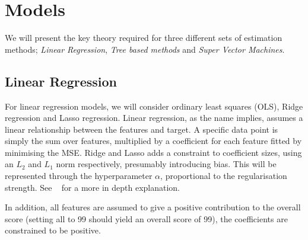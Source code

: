     \section{Models}
        We will present the key theory required for three different sets of estimation methods; \textit{Linear Regression}, \textit{Tree based methods} and \textit{Super Vector Machines}.
        \subsection{Linear Regression}
        For linear regression models, we will consider ordinary least squares (OLS), Ridge regression and Lasso regression. Linear regression, as the name implies, assumes a linear relationship between the features and target. A specific data point is simply the sum over features, multiplied by a coefficient for each feature fitted by minimising the MSE. Ridge and Lasso adds a constraint to coefficient sizes, using an $L_2$ and $L_1$ norm respectively, presumably introducing bias. This will be represented through the hyperparameter $\alpha$, proportional to the regularisation strength. See ~\citep{Project1} for a more in depth explanation.
            
        In addition, all features are assumed to give a positive contribution to the overall score (setting all to 99 should yield an overall score of 99), the coefficients are constrained to be positive.
        
